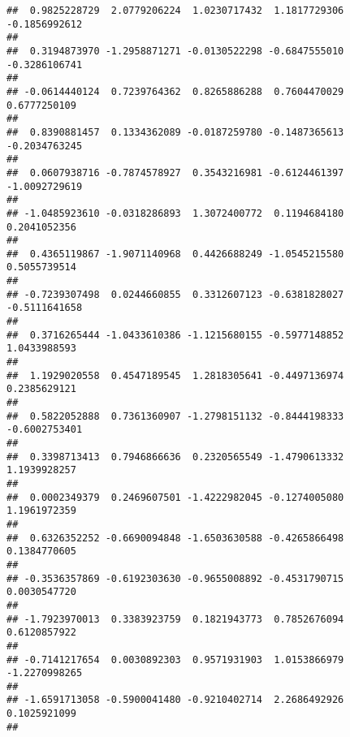 \documentclass[]{article}
\begin{document}
\begin{verbatim}
##  0.9825228729  2.0779206224  1.0230717432  1.1817729306 -0.1856992612 
##                                                                       
##  0.3194873970 -1.2958871271 -0.0130522298 -0.6847555010 -0.3286106741 
##                                                                       
## -0.0614440124  0.7239764362  0.8265886288  0.7604470029  0.6777250109 
##                                                                       
##  0.8390881457  0.1334362089 -0.0187259780 -0.1487365613 -0.2034763245 
##                                                                       
##  0.0607938716 -0.7874578927  0.3543216981 -0.6124461397 -1.0092729619 
##                                                                       
## -1.0485923610 -0.0318286893  1.3072400772  0.1194684180  0.2041052356 
##                                                                       
##  0.4365119867 -1.9071140968  0.4426688249 -1.0545215580  0.5055739514 
##                                                                       
## -0.7239307498  0.0244660855  0.3312607123 -0.6381828027 -0.5111641658 
##                                                                       
##  0.3716265444 -1.0433610386 -1.1215680155 -0.5977148852  1.0433988593 
##                                                                       
##  1.1929020558  0.4547189545  1.2818305641 -0.4497136974  0.2385629121 
##                                                                       
##  0.5822052888  0.7361360907 -1.2798151132 -0.8444198333 -0.6002753401 
##                                                                       
##  0.3398713413  0.7946866636  0.2320565549 -1.4790613332  1.1939928257 
##                                                                       
##  0.0002349379  0.2469607501 -1.4222982045 -0.1274005080  1.1961972359 
##                                                                       
##  0.6326352252 -0.6690094848 -1.6503630588 -0.4265866498  0.1384770605 
##                                                                       
## -0.3536357869 -0.6192303630 -0.9655008892 -0.4531790715  0.0030547720 
##                                                                       
## -1.7923970013  0.3383923759  0.1821943773  0.7852676094  0.6120857922 
##                                                                       
## -0.7141217654  0.0030892303  0.9571931903  1.0153866979 -1.2270998265 
##                                                                       
## -1.6591713058 -0.5900041480 -0.9210402714  2.2686492926  0.1025921099 
##                                                                       

\end{verbatim}
\end{document}
